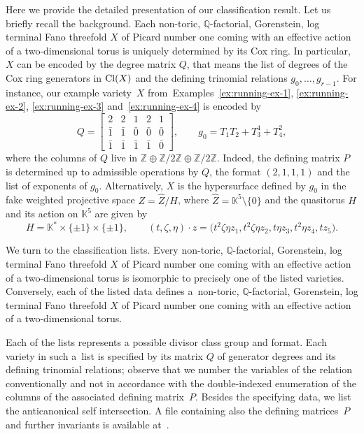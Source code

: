 \documentclass[pdftex]{sigma}%
\theoremstyle{definition}
\def\Cl{{\rm Cl}}
\def\KK{{\mathbb K}}
\def\ZZ{{\mathbb Z}}
\def\QQ{{\mathbb Q}}
\numberwithin{equation}{section}
\begin{document}
Here we provide the detailed presentation
of our classification result.
Let us briefly recall the background.
Each non-toric, $\QQ$-factorial, Gorenstein,
log terminal Fano threefold $X$ of Picard number
one coming with an effective action of a
two-dimensional torus is uniquely determined
by its Cox ring.
In particular, $X$ can be encoded by the degree
matrix $Q$, that means the list of degrees
of the Cox ring generators in $\Cl(X)$
and the defining trinomial relations
$g_0,\dots,g_{r-1}$.
For instance, our example variety~$X$
from~Examples~\ref{ex:running-ex-1},
\ref{ex:running-ex-2},
\ref{ex:running-ex-3}
and~\ref{ex:running-ex-4} is encoded by
\[
Q =
\begin{bmatrix}
2 & 2 & 1 & 2 & 1
\\
\bar 1 & \bar 1 & \bar 0 & \bar 0 & \bar 0
\\
\bar 1 & \bar 1 & \bar 1 & \bar 1 & \bar 0
\end{bmatrix}\!,
\qquad
g_0 = T_1T_2 + T_3^4 + T_4^2 ,
\]
where the columns of $Q$ live in
$\ZZ \oplus \ZZ/2\ZZ \oplus \ZZ / 2\ZZ$.
Indeed, the defining matrix $P$ is determined
up to admissible operations by $Q$, the
format $(2,1,1,1)$ and the list of exponents
of $g_0$.
Alternatively, $X$ is the hypersurface defined
by $g_0$ in the fake weighted projective
space $Z = \hat Z / H$, where
$\hat Z = \KK^5 \setminus \{0\}$
and the quasitorus $H$ and its action on $\KK^5$
are given by
\[
H = \KK^* \times \{\pm 1\} \times \{\pm 1\},\qquad
(t,\zeta,\eta) \cdot z =
\big(t^2\zeta\eta z_1, t^2\zeta\eta z_2, t\eta z_3,t^2\eta z_4, t z_5\big).
\]

We turn to the classification lists.
Every non-toric, $\QQ$-factorial, Gorenstein,
log terminal Fano threefold $X$ of Picard number
one coming with an effective action of a
two-dimensional torus is isomorphic to
precisely one of the listed varieties.
Conversely, each of the listed data defines a~non-toric, $\QQ$-factorial, Gorenstein,
log terminal Fano threefold $X$ of Picard number
one coming with an effective action of a
two-dimensional torus.

Each of the lists represents a possible
divisor class group and format.
Each variety in such a~list is specified
by its matrix $Q$ of generator degrees and
its defining trinomial relations; observe
that we number the variables of the relation
conventionally and not in accordance with
the double-indexed enumeration of the columns
of the associated defining matrix~$P$.
Besides the specifying data, we list the
anticanonical self intersection.
A file containing also the defining
matrices~$P$ and further invariants is
available at~\cite{BaHa}.
\end{document}
